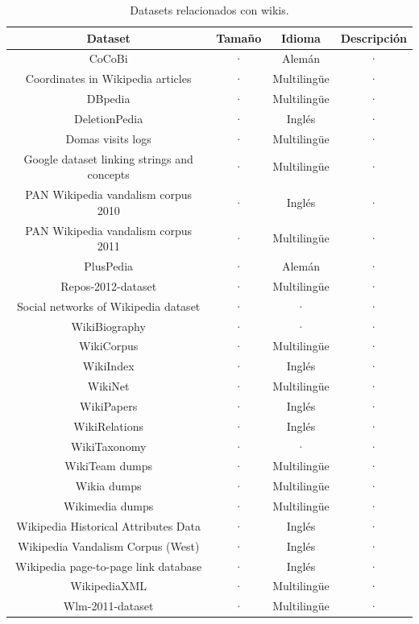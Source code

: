 \documentclass[11pt,onecolumn]{article}
\begin{document}
\begin{table}
\centering
\begin{tabular}{| c | c | c | c |}
\hline
\textbf{Dataset} & \textbf{Tamaño} & \textbf{Idioma} & \textbf{Descripción} \\
\hline
CoCoBi & · & Alemán & · \\ \hline 
Coordinates in Wikipedia articles & · & Multilingüe & · \\ \hline 
DBpedia & · & Multilingüe & · \\ \hline 
DeletionPedia & · & Inglés & · \\ \hline 
Domas visits logs & · & Multilingüe & · \\ \hline 
Google dataset linking strings and concepts & · & Multilingüe & · \\ \hline 
PAN Wikipedia vandalism corpus 2010 & · & Inglés & · \\ \hline 
PAN Wikipedia vandalism corpus 2011 & · & Multilingüe & · \\ \hline 
PlusPedia & · & Alemán & · \\ \hline 
Repos-2012-dataset & · & Multilingüe & · \\ \hline 
Social networks of Wikipedia dataset & · & · & · \\ \hline 
WikiBiography & · & · & · \\ \hline 
WikiCorpus & · & Multilingüe & · \\ \hline 
WikiIndex & · & Inglés & · \\ \hline 
WikiNet & · & Multilingüe & · \\ \hline 
WikiPapers & · & Inglés & · \\ \hline 
WikiRelations & · & Inglés & · \\ \hline 
WikiTaxonomy & · & · & · \\ \hline 
WikiTeam dumps & · & Multilingüe & · \\ \hline 
Wikia dumps & · & Multilingüe & · \\ \hline 
Wikimedia dumps & · & Multilingüe & · \\ \hline 
Wikipedia Historical Attributes Data & · & Inglés & · \\ \hline 
Wikipedia Vandalism Corpus (West) & · & Inglés & · \\ \hline 
Wikipedia page-to-page link database & · & Inglés & · \\ \hline 
WikipediaXML & · & Multilingüe & · \\ \hline 
Wlm-2011-dataset & · & Multilingüe & · \\ \hline
\end{tabular}
\caption{Datasets relacionados con wikis.}
\label{tab:datasetstable}
\end{table}
\end{document}
